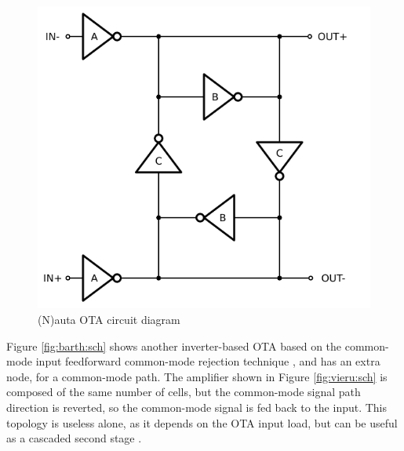\documentclass[conference]{IEEEtran}
\begin{document}
\begin{figure}[!htbp]
	\centerline{\includegraphics[scale=0.50]{circuits/nauta.pdf}}
	\caption{(N)auta OTA circuit diagram \cite{nauta1992cmos}}
	\label{fig:nauta:sch}
\end{figure}

 Figure \ref{fig:barth:sch} shows another inverter-based OTA based on the common-mode input feedforward common-mode rejection technique \cite{barthelemy2008ota}, and has an extra node, for a common-mode path. The amplifier shown in Figure \ref{fig:vieru:sch} is composed of the same number of cells, but the common-mode signal path direction is reverted, so the common-mode signal is fed back to the input. This topology is useless alone, as it depends on the OTA input load, but can be useful as a cascaded second stage \cite{vieru2011inverter}.
\end{document}
